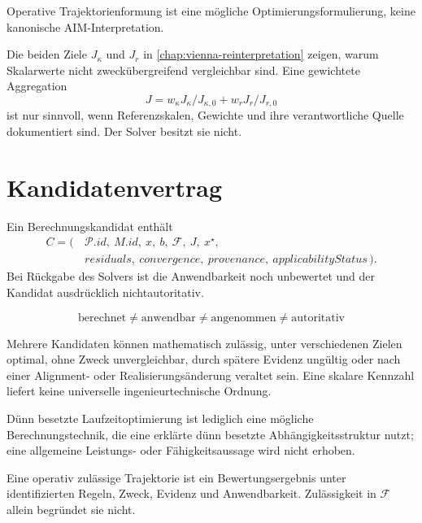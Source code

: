 \begin{definition}
\label{def:optimization-trajectory-shaping}
Operative Trajektorienformung ist eine mögliche Optimierungsformulierung,
keine kanonische AIM-Interpretation.
\end{definition}

Die beiden Ziele \(J_\kappa\) und \(J_r\) in
\cref{chap:vienna-reinterpretation} zeigen, warum Skalarwerte nicht
zweckübergreifend vergleichbar sind. Eine gewichtete Aggregation
\[
J=w_\kappa J_\kappa/J_{\kappa,0}+w_rJ_r/J_{r,0}
\]
ist nur sinnvoll, wenn Referenzskalen, Gewichte und ihre verantwortliche
Quelle dokumentiert sind. Der Solver besitzt sie nicht.

\section{Kandidatenvertrag}

Ein Berechnungskandidat enthält
\[
\begin{aligned}
C=(\, &\mathcal P.id,\ M.id,\ x,\ b,\ \mathcal F,\ J,\ x^\star,\\
      &residuals,\ convergence,\ provenance,\ applicabilityStatus\,).
\end{aligned}
\]
Bei Rückgabe des Solvers ist die Anwendbarkeit noch unbewertet und der
Kandidat ausdrücklich nichtautoritativ.

\[
\boxed{\text{berechnet}
\neq\text{anwendbar}
\neq\text{angenommen}
\neq\text{autoritativ}}
\]

Mehrere Kandidaten können mathematisch zulässig, unter verschiedenen Zielen
optimal, ohne Zweck unvergleichbar, durch spätere Evidenz ungültig oder nach
einer Alignment- oder Realisierungsänderung veraltet sein. Eine skalare
Kennzahl liefert keine universelle ingenieurtechnische Ordnung.

\begin{definition}
\label{def:sparse-runtime-optimization}
Dünn besetzte Laufzeitoptimierung ist lediglich eine mögliche
Berechnungstechnik, die eine erklärte dünn besetzte Abhängigkeitsstruktur
nutzt; eine allgemeine Leistungs- oder Fähigkeitsaussage wird nicht erhoben.
\end{definition}

\begin{definition}
\label{def:operationally-admissible-trajectory}
Eine operativ zulässige Trajektorie ist ein Bewertungsergebnis unter
identifizierten Regeln, Zweck, Evidenz und Anwendbarkeit. Zulässigkeit in
\(\mathcal F\) allein begründet sie nicht.
\end{definition}

